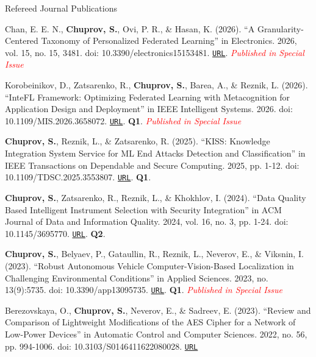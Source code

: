 \begin{rSection}{Refereed Journal Publications}
\begin{enumerate}[label=[J{{\arabic*}]}]

\item Chan, E. E. N., \textbf{Chuprov, S.}, Ovi, P. R., \& Hasan, K. (2026). ``A Granularity-Centered Taxonomy of Personalized Federated Learning'' in Electronics. 2026, vol. 15, no. 15, 3481. doi: 10.3390/electronics15153481. \href{https://www.mdpi.com/2079-9292/15/15/3481}{\nolinkurl{URL}}. \scriptsize{\textcolor{red}{\textit{Published in Special Issue}}}\normalsize

\item Korobeinikov, D., Zatsarenko, R., \textbf{Chuprov, S.}, Barea, A., \& Reznik, L. (2026). ``InteFL Framework: Optimizing Federated Learning with Metacognition for Application Design and Deployment'' in IEEE Intelligent Systems. 2026. doi: 10.1109/MIS.2026.3658072. 
\href{https://ieeexplore.ieee.org/abstract/document/11366920}{\nolinkurl{URL}}. \textbf{Q1}. \scriptsize{\textcolor{red}{\textit{Published in Special Issue}}}\normalsize

\item \textbf{Chuprov, S.}, Reznik, L., \& Zatsarenko, R. (2025). ``KISS: Knowledge Integration System Service for ML End Attacks Detection and Classification'' in IEEE Transactions on Dependable and Secure Computing. 2025, pp. 1-12. doi: 10.1109/TDSC.2025.3553807. 
\href{https://ieeexplore.ieee.org/abstract/document/10937050}{\nolinkurl{URL}}. \textbf{Q1}. 

\item \textbf{Chuprov, S.}, Zatsarenko, R., Reznik, L., \& Khokhlov, I. (2024). ``Data Quality Based Intelligent Instrument Selection with Security Integration'' in ACM Journal of Data and Information Quality. 2024, vol. 16, no. 3, pp. 1-24. doi: 10.1145/3695770. 
\href{https://dl.acm.org/doi/full/10.1145/3695770}{\nolinkurl{URL}}. \textbf{Q2}. 

\item \textbf{\textbf{Chuprov, S.}}, Belyaev, P., Gataullin, R., Reznik, L., Neverov, E., \& Viksnin, I. (2023). ``Robust Autonomous Vehicle Computer-Vision-Based Localization in Challenging Environmental Conditions'' in Applied Sciences. 2023, no. 13(9):5735. doi: 10.3390/app13095735. \href{https://www.mdpi.com/2076-3417/13/9/5735}{\nolinkurl{URL}}. \textbf{Q1}. \scriptsize{\textcolor{red}{\textit{Published in Special Issue}}}\normalsize

\item Berezovskaya, O., \textbf{Chuprov, S.}, Neverov, E., \& Sadreev, E. (2023). ``Review and Comparison of Lightweight Modifications of the AES Cipher for a Network of Low-Power Devices'' in Automatic Control and Computer Sciences. 2022, no. 56, pp. 994-1006. doi: 10.3103/S0146411622080028. \href{https://link.springer.com/article/10.3103/S0146411622080028}{\nolinkurl{URL}}


\end{enumerate}
\end{rSection}
